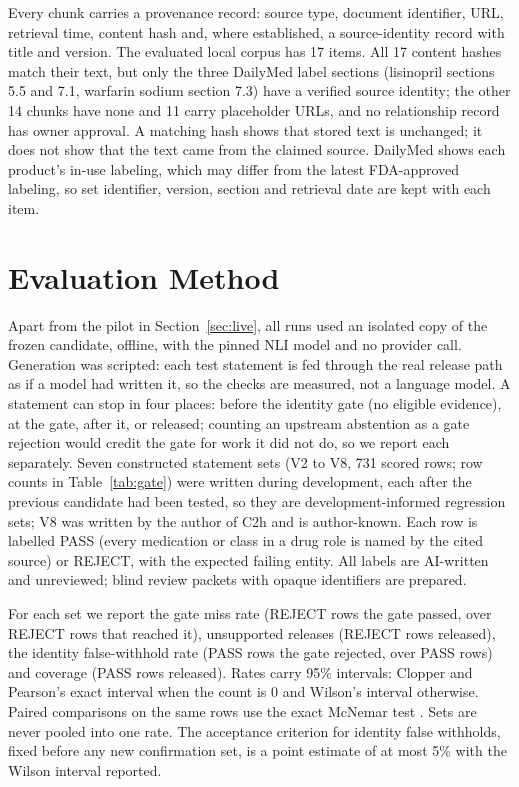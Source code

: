 \documentclass[conference]{IEEEtran}
\begin{document}
Every chunk carries a provenance record: source type, document identifier, URL, retrieval time, content hash and, where
established, a source-identity record with title and version. The evaluated local corpus has 17 items. All 17 content
hashes match their text, but only the three DailyMed label sections (lisinopril sections 5.5 and 7.1, warfarin sodium
section 7.3) have a verified source identity; the other 14 chunks have none and 11 carry placeholder URLs, and no
relationship record has owner approval. A matching hash shows that stored text is unchanged; it does not show that the
text came from the claimed source. DailyMed shows each product's in-use labeling, which may differ from the latest
FDA-approved labeling, so set identifier, version, section and retrieval date are kept with each item.

\section{Evaluation Method}
\label{sec:method}

Apart from the pilot in Section~\ref{sec:live}, all runs used an isolated copy of the frozen candidate, offline, with
the pinned NLI model and no provider call.
Generation was scripted: each test statement is fed through the real release path as if a model had written it, so the
checks are measured, not a language model. A statement can stop in four places: before the identity gate (no
eligible evidence), at the gate, after it, or released; counting an upstream abstention as a gate rejection would
credit the gate for work it did not do, so we report each separately. Seven constructed statement sets (V2 to V8,
731 scored rows; row counts in Table~\ref{tab:gate}) were written
during development, each after the previous candidate had been tested, so they are development-informed regression
sets; V8 was written by the author of C2h and is author-known. Each row is labelled PASS (every medication or class in a
drug role is named by the cited source) or REJECT, with the expected failing entity. All labels are AI-written and
unreviewed; blind review packets with opaque identifiers are prepared.


For each set we report the gate miss rate (REJECT rows the gate passed, over REJECT rows that reached it), unsupported
releases (REJECT rows released), the identity false-withhold rate (PASS rows the gate rejected, over PASS rows) and
coverage (PASS rows released). Rates carry 95\% intervals: Clopper and Pearson's exact interval \cite{clopper1934}
when the count is 0 and Wilson's interval \cite{wilson1927} otherwise. Paired comparisons on the same rows use the
exact McNemar test \cite{mcnemar1947}. Sets are never pooled into one rate. The acceptance criterion for identity false
withholds, fixed before any new confirmation set, is a point estimate of at most 5\% with the Wilson interval reported.
\end{document}
